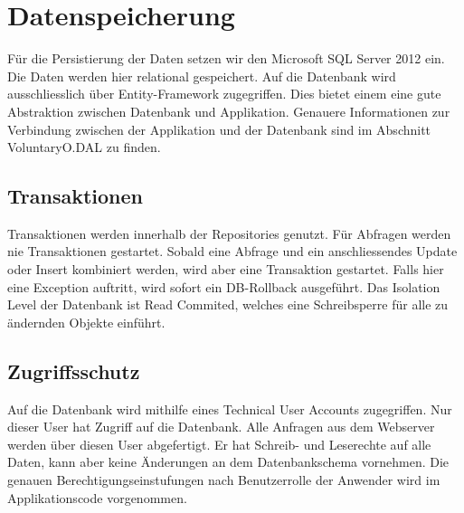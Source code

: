 \chapter{Datenspeicherung}
	Für die Persistierung der Daten setzen wir den Microsoft SQL Server 2012 ein. Die Daten werden hier relational gespeichert.
	Auf die Datenbank wird ausschliesslich über Entity-Framework zugegriffen. Dies bietet einem eine gute Abstraktion zwischen Datenbank und Applikation.
	Genauere Informationen zur Verbindung zwischen der Applikation und der Datenbank sind im Abschnitt VoluntaryO.DAL zu finden.
	\section{Transaktionen}
	Transaktionen werden innerhalb der Repositories genutzt. Für Abfragen werden nie Transaktionen gestartet. Sobald eine Abfrage und ein anschliessendes Update oder Insert kombiniert werden, wird aber eine Transaktion gestartet. Falls hier eine Exception auftritt, wird sofort ein DB-Rollback ausgeführt.
	Das Isolation Level der Datenbank ist Read Commited, welches eine Schreibsperre für alle zu ändernden Objekte einführt.
	\section{Zugriffsschutz}
	Auf die Datenbank wird mithilfe eines Technical User Accounts zugegriffen. Nur dieser User hat Zugriff auf die Datenbank. Alle Anfragen aus dem Webserver werden über diesen User abgefertigt. Er hat Schreib- und Leserechte auf alle Daten, kann aber keine Änderungen an dem Datenbankschema vornehmen.
	Die genauen Berechtigungseinstufungen nach Benutzerrolle der Anwender wird im Applikationscode vorgenommen.
